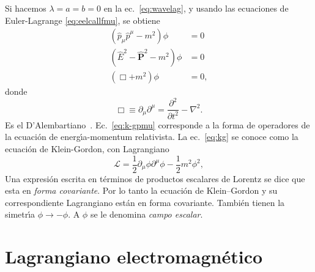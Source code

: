 Si hacemos $\lambda=a=b=0$ en la ec.~\eqref{eq:wavelag}, y usando las
ecuaciones de Euler-Lagrange \eqref{eq:eelcallfmu}, se obtiene
\begin{align}
  (\hat{p}_\mu\hat{p}^\mu-m^2)\phi&=0\nonumber\\
  \label{eq:k-gpmu} %
(\hat{E}^2-\hat{\mathbf{P}}^2-m^2)\phi&=0\\
\label{eq:kg} 
  (\Box+m^2)\phi&=0,
\end{align}
donde
\begin{equation}
  \label{eq:dalambertiano}
  \Box\equiv\partial_\mu\partial^\mu=\frac{\partial^2}{\partial t^2}-\nabla^2. 
\end{equation}
Es el D'Alembartiano~\cite{daelembertiano}. 
Ec.~\eqref{eq:k-gpmu} %
corresponde a la forma de operadores de la
ecuaci\'on de energ\'\i a-momentum relativista. La
ec.~\eqref{eq:kg} se conoce como la ecuaci\'on de Klein-Gordon, con
Lagrangiano
\begin{equation}
  \label{eq:kglag}
  \mathcal{L}=\frac{1}{2}\partial_\mu\phi\partial^\mu\phi-\frac{1}{2}m^2\phi^2, 
\end{equation}
Una expresi\'on escrita en t\'erminos de productos escalares de
Lorentz se dice que esta en \emph{forma covariante}. Por lo tanto la
ecuaci\'on de Klein--Gordon y su correspondiente Lagrangiano est\'an
en forma covariante. Tambi\'en tienen la simetr\'\i a
$\phi\to-\phi$. A $\phi$ se le denomina \emph{campo escalar}.



\section{Lagrangiano electromagnético}

